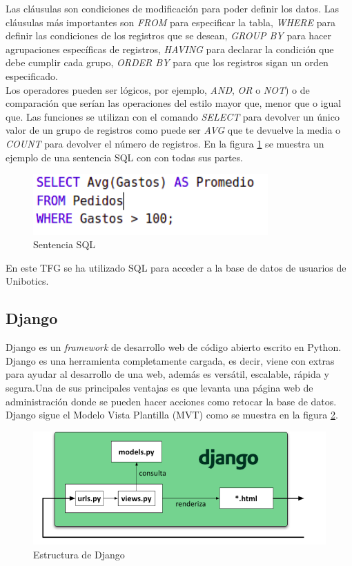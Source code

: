 \newpage
Las cláusulas son condiciones de modificación para poder definir los datos. Las cláusulas más importantes son \textit{FROM} para especificar la tabla, \textit{WHERE} para definir las condiciones de los registros que se desean, \textit{GROUP BY} para hacer agrupaciones específicas de registros, \textit{HAVING} para declarar la condición que debe cumplir cada grupo, \textit{ORDER BY} para que los registros sigan un orden especificado.\\

Los operadores pueden ser lógicos, por ejemplo, \textit{AND}, \textit{OR} o \textit{NOT}) o de comparación que serían las operaciones del estilo mayor que, menor que o igual que. Las funciones se utilizan con el comando \textit{SELECT} para devolver un único valor de un grupo de registros como puede ser\textit{ AVG }que te devuelve la media o \textit{COUNT }para devolver el número de registros. En la figura \ref{fig:ejsql} se muestra un ejemplo de una sentencia SQL con con todas sus partes.\cite{sql}\\

\begin{figure}[H]
    \centering
    \includegraphics[width=9cm, keepaspectratio]{img/ejsql.png}
    \caption{Sentencia SQL}
    \label{fig:ejsql}
\end{figure}
En este TFG se ha utilizado SQL para acceder a la base de datos de usuarios de Unibotics.

\subsection{Django}
Django es un \textit{framework} de desarrollo web de código abierto escrito en Python. Django es una herramienta completamente cargada, es decir, viene con extras para ayudar al desarrollo de una web, además es versátil, escalable, rápida y segura.Una de sus principales ventajas es que  levanta una página web de administración donde se pueden hacer acciones como retocar la base de datos. Django sigue el Modelo Vista Plantilla (MVT) como se muestra en la figura \ref{fig:django}.\\

\begin{figure}[H]
    \centering
    \includegraphics[width=12cm, keepaspectratio]{img/django.png}
    \caption{Estructura de Django}
    \label{fig:django}
\end{figure}

